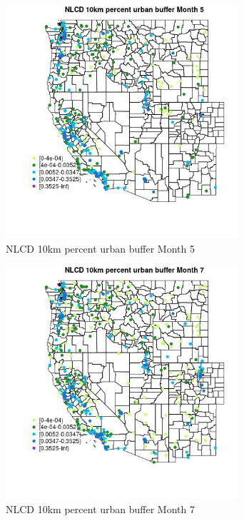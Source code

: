 \begin{figure} 
\centering  
\includegraphics[width=0.77\textwidth]{Code_Outputs/Report_ML_input_PM25_Step4_part_e_de_duplicated_aves_compiled_2019-05-18wNAs_MapObsMo5NLCD_10km_percent_urban_buffer.jpg} 
\caption{\label{fig:Report_ML_input_PM25_Step4_part_e_de_duplicated_aves_compiled_2019-05-18wNAsMapObsMo5NLCD_10km_percent_urban_buffer}NLCD 10km percent urban buffer Month 5} 
\end{figure} 
 

\begin{figure} 
\centering  
\includegraphics[width=0.77\textwidth]{Code_Outputs/Report_ML_input_PM25_Step4_part_e_de_duplicated_aves_compiled_2019-05-18wNAs_MapObsMo7NLCD_10km_percent_urban_buffer.jpg} 
\caption{\label{fig:Report_ML_input_PM25_Step4_part_e_de_duplicated_aves_compiled_2019-05-18wNAsMapObsMo7NLCD_10km_percent_urban_buffer}NLCD 10km percent urban buffer Month 7} 
\end{figure} 
 

